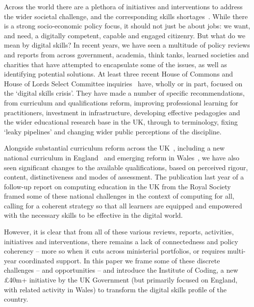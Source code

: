 \documentclass[sigconf,anonymous]{acmart}
\begin{document}
Across the world there are a plethora of initiatives and interventions
to address the wider societal challenge, and the corresponding skills
shortages~\cite{cece:2017}. While there is a strong socio-economic
policy focus, it should not just be about jobs: we want, and need, a
digitally competent, capable and engaged citizenry. But what do we
mean by digital skills? In recent years, we have seen a multitude of
policy reviews and reports from across government, academia, think
tanks, learned societies and charities that have attempted to
encapsulate some of the issues, as well as identifying potential
solutions. At least three recent House of Commons and House of Lords
Select Committee
inquiries~\cite{ukholds:2015,ukhocst:2016,ukholc:2017} have, wholly or
in part, focused on the `digital skills crisis'. They have made a
number of specific recommendations, from curriculum and qualifications
reform, improving professional learning for practitioners, investment
in infrastructure, developing effective pedagogies and the wider
educational research base in the UK, through to terminology, fixing
`leaky pipelines' and changing wider public perceptions of the
discipline.

Alongside substantial curriculum reform across the
UK~\cite{crick+sentance:2011,brown-et-al:sigcse2013,brown-et-al:toce2014},
including a new national curriculum in England~\cite{DfE2013a} and
emerging reform in
Wales~\cite{wgictreview:2013,crick+moller:wipsce2015,moller+crick:jce2018},
we have also seen significant changes to the available qualifications,
based on perceived rigour, content, distinctiveness and modes of
assessment. The publication last year of a follow-up report on
computing education in the UK from the Royal Society~\cite{rs:2017}
framed some of these national challenges in the context of computing
for all, calling for a coherent strategy so that all learners are
equipped and empowered with the necessary skills to be effective in
the digital world.

However, it is clear that from all of these various reviews, reports,
activities, initiatives and interventions, there remains a lack of
connectedness and policy coherency -- more so when it cuts across
ministerial portfolios, or requires multi-year coordinated support. In
this paper we frame some of these discrete challenges -- and
opportunities -- and introduce the Institute of Coding, a new
\pounds40m+ initiative by the UK Government (but primarily focused on
England, with related activity in Wales) to transform the digital
skills profile of the country.
\end{document}
